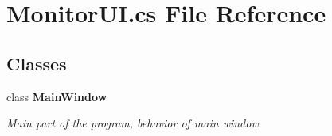 \section{Monitor\+U\+I.\+cs File Reference}
\label{_monitor_u_i_8cs}
\subsection*{Classes}
\begin{DoxyCompactItemize}
\item 
class \textbf{ Main\+Window}
\begin{DoxyCompactList}\small\item\em Main part of the program, behavior of main window \end{DoxyCompactList}\end{DoxyCompactItemize}
